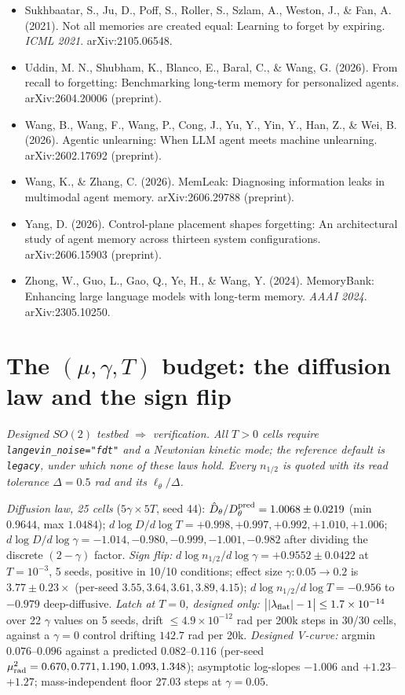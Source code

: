 \documentclass{article}
\begin{document}
{\begin{itemize}
\item Sukhbaatar, S., Ju, D., Poff, S., Roller, S., Szlam, A., Weston, J., \& Fan, A. (2021). Not all memories are created equal: Learning to forget by expiring. \emph{ICML 2021}. arXiv:2105.06548.
\item Uddin, M. N., Shubham, K., Blanco, E., Baral, C., \& Wang, G. (2026). From recall to forgetting: Benchmarking long-term memory for personalized agents. arXiv:2604.20006 (preprint).
\item Wang, B., Wang, F., Wang, P., Cong, J., Yu, Y., Yin, Y., Han, Z., \& Wei, B. (2026). Agentic unlearning: When LLM agent meets machine unlearning. arXiv:2602.17692 (preprint).
\item Wang, K., \& Zhang, C. (2026). MemLeak: Diagnosing information leaks in multimodal agent memory. arXiv:2606.29788 (preprint).
\item Yang, D. (2026). Control-plane placement shapes forgetting: An architectural study of agent memory across thirteen system configurations. arXiv:2606.15903 (preprint).
\item Zhong, W., Guo, L., Gao, Q., Ye, H., \& Wang, Y. (2024). MemoryBank: Enhancing large language models with long-term memory. \emph{AAAI 2024}. arXiv:2305.10250.
\end{itemize}\par}
\section{The $(\mu,\gamma,T)$ budget: the diffusion law and the sign flip}\label{app:budget}

\emph{Designed $SO(2)$ testbed $\Rightarrow$ verification. All $T>0$ cells require \texttt{langevin\_noise="fdt"} and a Newtonian kinetic mode; the reference default is \texttt{legacy}, under which none of these laws hold. Every $n_{1/2}$ is quoted with its read tolerance $\Delta=0.5$ rad and its $\ell_\theta/\Delta$.}

\emph{Diffusion law, 25 cells} ($5\gamma\times5T$, seed 44): $\hat D_\theta/D_\theta^{\rm pred}=1.0068\pm0.0219$ (min $0.9644$, max $1.0484$); $d\log D/d\log T=+0.998,+0.997,+0.992,+1.010,+1.006$; $d\log D/d\log\gamma=-1.014,-0.980,-0.999,-1.001,-0.982$ after dividing the discrete $(2-\gamma)$ factor. \emph{Sign flip:} $d\log n_{1/2}/d\log\gamma=+0.9552\pm0.0422$ at $T=10^{-3}$, 5 seeds, positive in 10/10 conditions; effect size $\gamma:0.05\to0.2$ is $3.77\pm0.23\times$ (per-seed $3.55,3.64,3.61,3.89,4.15$); $d\log n_{1/2}/d\log T=-0.956$ to $-0.979$ deep-diffusive. \emph{Latch at $T=0$, designed only:} $\big||\lambda_{\rm flat}|-1\big|\le1.7\times10^{-14}$ over 22 $\gamma$ values on 5 seeds, drift $\le4.9\times10^{-12}$ rad per 200k steps in 30/30 cells, against a $\gamma=0$ control drifting $142.7$ rad per 20k. \emph{Designed V-curve:} argmin $0.076$--$0.096$ against a predicted $0.082$--$0.116$ (per-seed $\mu^2_{\rm rad}=0.670,0.771,1.190,1.093,1.348$); asymptotic log-slopes $-1.006$ and $+1.23$--$+1.27$; mass-independent floor $27.03$ steps at $\gamma=0.05$.
\end{document}

